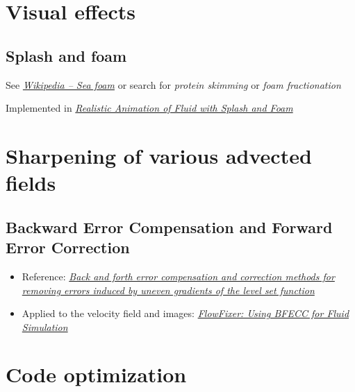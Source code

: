 \section{Visual effects}

\subsection{Splash and foam}

See \textit{\href{http://en.wikipedia.org/wiki/Sea_foam}{Wikipedia -- Sea foam}} or search for \textit{protein skimming} or \textit{foam fractionation}

Implemented in \textit{\href{http://nguyendangbinh.org/Proceedings/Eurographics/2003/cgf/volume22/issue3/paper127/paper127.pdf}{Realistic Animation of Fluid with Splash and Foam}}

\section{Sharpening of various advected fields}

\subsection{Backward Error Compensation and Forward Error Correction}

\begin{itemize}
    \item Reference: \textit{\href{http://smartech.gatech.edu/xmlui/bitstream/handle/1853/29473/2002-389.pdf}{Back and forth error compensation and correction methods for removing errors induced by uneven gradients of the level set function}}
    \item Applied to the velocity field and images: \textit{\href{http://www.gvu.gatech.edu/~jarek/papers/FlowFixer.pdf}{FlowFixer: Using BFECC for Fluid Simulation}}
\end{itemize}

\section{Code optimization}